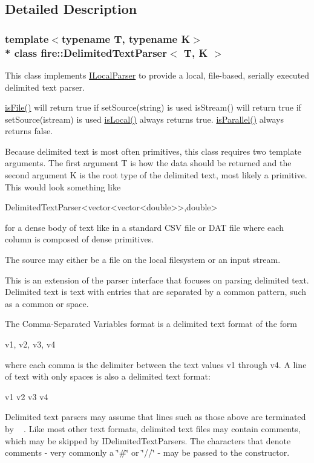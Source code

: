 \subsection{Detailed Description}
\subsubsection*{template$<$typename T, typename K$>$\\*
class fire\+::\+Delimited\+Text\+Parser$<$ T, K $>$}

This class implements \hyperlink{a00143}{I\+Local\+Parser} to provide a local, file-\/based, serially executed delimited text parser.

\hyperlink{a00143_a091d5cf56bf8f407854ef87f460b2958}{is\+File()} will return true if set\+Source(string) is used is\+Stream() will return true if set\+Source(istream) is used \hyperlink{a00143_a770acae6e216de3a9c7140a12de25d58}{is\+Local()} always returns true. \hyperlink{a00143_ad46898c516adcce38acbb4800dc9777b}{is\+Parallel()} always returns false.

Because delimited text is most often primitives, this class requires two template arguments. The first argument T is how the data should be returned and the second argument K is the root type of the delimited text, most likely a primitive. This would look something like


\begin{DoxyCode}
DelimitedTextParser<vector<vector<double>>,\textcolor{keywordtype}{double}>
\end{DoxyCode}


for a dense body of text like in a standard C\+SV file or D\+AT file where each column is composed of dense primitives.

The source may either be a file on the local filesystem or an input stream.

This is an extension of the parser interface that focuses on parsing delimited text. Delimited text is text with entries that are separated by a common pattern, such as a common or space.

The Comma-\/\+Separated Variables format is a delimited text format of the form

v1, v2, v3, v4

where each comma is the delimiter between the text values v1 through v4. A line of text with only spaces is also a delimited text format\+:

v1 v2 v3 v4

Delimited text parsers may assume that lines such as those above are terminated by ~\newline
. Like most other text formats, delimited text files may contain comments, which may be skipped by I\+Delimited\+Text\+Parsers. The characters that denote comments -\/ very commonly a \char`\"{}\#\char`\"{} or \char`\"{}//\char`\"{} -\/ may be passed to the constructor. 


